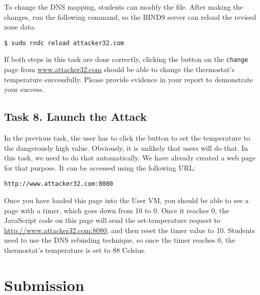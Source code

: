 To change the DNS mapping, students can modify the 
 file. After making the changes,
run the following command, so the BIND9 server can reload the revised zone data. 

\begin{lstlisting}
$ sudo rndc reload attacker32.com
\end{lstlisting}
 

If both steps in this task are done correctly, clicking the button 
on the \texttt{change} page from \url{www.attacker32.com} should be able to change
the thermostat's temperature successfully. Please provide evidence in your report to
demonstrate your success.


\subsection{Task 8. Launch the Attack}

In the previous task, the user has to click the button to set the 
temperature to the dangerously high value. Obviously, it is unlikely that users will 
do that.  In this task, we need to do that automatically. We have already created 
a web page for that purpose. It can be accessed using the following URL:


\begin{lstlisting}
http://www.attacker32.com:8080
\end{lstlisting}
 

Once you have loaded this page into the User VM, you should be able to see a page with a 
timer, which goes down from 10 to 0. Once it reaches 0, the JavaScript code 
on this page will send the set-temperature request to 
\url{http://www.attacker32.com:8080}, and then reset the timer value to 10. 
Students need to use the DNS rebinding technique, so
once the timer reaches 0, the thermostat's temperature is set to 
88 Celsius. 



\section{Submission}

\seedsubmission



